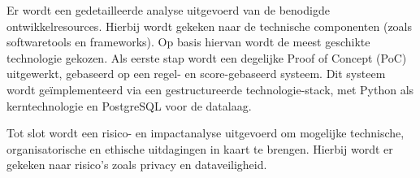 \vspace{1em}Er wordt een gedetailleerde analyse uitgevoerd van de benodigde ontwikkelresources. Hierbij wordt gekeken naar de technische componenten (zoals softwaretools en frameworks). Op basis hiervan wordt de meest geschikte technologie gekozen. Als eerste stap wordt een degelijke Proof of Concept (PoC) uitgewerkt, gebaseerd op een regel- en score-gebaseerd systeem. Dit systeem wordt geïmplementeerd via een gestructureerde technologie-stack, met Python als kerntechnologie en PostgreSQL voor de datalaag.

\vspace{1em}Tot slot wordt een risico- en impactanalyse uitgevoerd om mogelijke technische, organisatorische en ethische uitdagingen in kaart te brengen. Hierbij wordt er gekeken naar risico’s zoals privacy en dataveiligheid.







